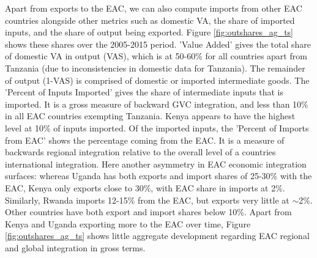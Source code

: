 \documentclass[a4paper]{article}
\begin{document}

Apart from exports to the EAC, we can also compute imports from other EAC countries alongside other metrics such as domestic VA, the share of imported inputs, and the share of output being exported. Figure \ref{fig:outshares_ag_ts} shows these shares over the 2005-2015 period. 'Value Added' gives the total share of domestic VA in output (VAS), which is at 50-60\% for all countries apart from Tanzania (due to inconsistencies in domestic data for Tanzania). The remainder of output (1-VAS) is comprised of domestic or imported intermediate goods. The 'Percent of Inputs Imported' gives the share of intermediate inputs that is imported. It is a gross measure of backward GVC integration, and less than 10\% in all EAC countries exempting Tanzania. Kenya appears to have the highest level at 10\% of inputs imported. Of the imported inputs, the 'Percent of Imports from EAC' shows the percentage coming from the EAC. It is a measure of backwards regional integration relative to the overall level of a countries international integration. %
Here another asymmetry in EAC economic integration surfaces: whereas Uganda has both exports and import shares of 25-30\% with the EAC, Kenya only exports close to 30\%, with EAC share in imports at 2\%. Similarly, Rwanda imports 12-15\% from the EAC, but exports very little at $\sim$2\%. Other countries have both export and import shares below 10\%. Apart from Kenya and Uganda exporting more to the EAC over time, Figure \ref{fig:outshares_ag_ts} shows little aggregate development regarding EAC regional and global integration in gross terms. 

\end{document}
